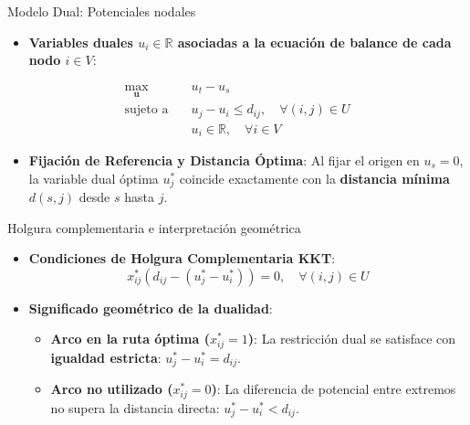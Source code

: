 \documentclass[
  ignorenonframetext,
]{beamer}
\providecommand{\tightlist}{%
  \setlength{\itemsep}{0pt}\setlength{\parskip}{0pt}}
\begin{document}
\begin{frame}{Modelo Dual: Potenciales nodales}
\label{modelo-dual-potenciales-nodales}
\begin{itemize}
\tightlist
\item
  \textbf{Variables duales \(u_i \in \mathbb{R}\) asociadas a la
  ecuación de balance de cada nodo \(i \in V\)}:
\end{itemize}

\[
\begin{aligned}
\max_{\mathbf{u}} \quad & u_t - u_s \\
\text{sujeto a} \quad & u_j - u_i \le d_{ij}, \quad \forall (i, j) \in U \\
& u_i \in \mathbb{R}, \quad \forall i \in V
\end{aligned}
\]

\begin{itemize}
\tightlist
\item
  \textbf{Fijación de Referencia y Distancia Óptima}: Al fijar el origen
  en \(u_s = 0\), la variable dual óptima \(u_j^*\) coincide exactamente
  con la \textbf{distancia mínima \(d(s, j)\)} desde \(s\) hasta \(j\).
\end{itemize}
\end{frame}

\begin{frame}{Holgura complementaria e interpretación geométrica}
\label{holgura-complementaria-e-interpretaciuxf3n-geomuxe9trica}
\begin{itemize}
\item
  \textbf{Condiciones de Holgura Complementaria KKT}:
  \[x_{ij}^* \left( d_{ij} - (u_j^* - u_i^*) \right) = 0, \quad \forall (i, j) \in U\]
\item
  \textbf{Significado geométrico de la dualidad}:

  \begin{itemize}
  \tightlist
  \item
    \textbf{Arco en la ruta óptima (\(x_{ij}^* = 1\))}: La restricción
    dual se satisface con \textbf{igualdad estricta}:
    \(u_j^* - u_i^* = d_{ij}\).
  \item
    \textbf{Arco no utilizado (\(x_{ij}^* = 0\))}: La diferencia de
    potencial entre extremos no supera la distancia directa:
    \(u_j^* - u_i^* < d_{ij}\).
  \end{itemize}
\end{itemize}
\end{frame}
\end{document}
